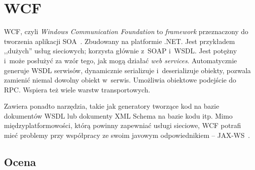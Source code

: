 %
%
%
%
%
%
%
%
%
%
%
%
%




\section{WCF}
WCF, czyli \emph{Windows Communication Foundation} to \emph{framework} przeznaczony do tworzenia aplikacji SOA~\cite{wcf}. Zbudowany na platformie .NET.
Jest przykładem ,,dużych'' usług sieciowych; korzysta głównie z~SOAP i~WSDL.
Jest potężny i~może posłużyć za wzór tego, jak mogą działać \emph{web services}.
Automatycznie generuje WSDL serwisów, dynamicznie serializuje i~deserializuje obiekty, pozwala zamienić niemal dowolny obiekt w~serwis.
Umożliwia obiektowe podejście do RPC.
Wspiera też wiele warstw transportowych.

Zawiera ponadto narzędzia, takie jak generatory tworzące kod na bazie dokumentów WSDL lub dokumenty XML Schema na bazie kodu itp.
Mimo międzyplatformowości, którą powinny zapewniać usługi sieciowe, WCF potrafi mieć problemy przy współpracy ze swoim javowym odpowiednikiem -- JAX-WS~\cite{wcf-jaxws}.

\subsection{Ocena}

